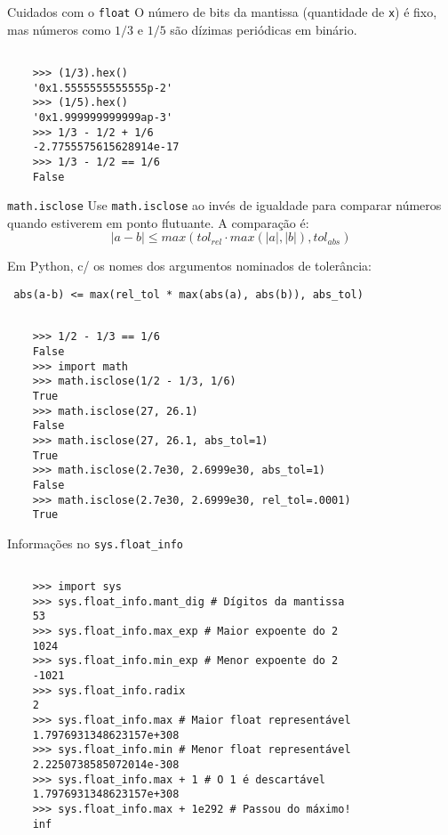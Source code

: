 \documentclass[utf8]{beamer}
\begin{document}
\begin{frame}[fragile]{Cuidados com o \texttt{float}}
  O número de bits da mantissa (quantidade de \texttt{x}) é fixo,
  mas números como $1/3$ e $1/5$ são dízimas periódicas em binário.

  \begin{verbatim}

    >>> (1/3).hex()
    '0x1.5555555555555p-2'
    >>> (1/5).hex()
    '0x1.999999999999ap-3'
    >>> 1/3 - 1/2 + 1/6
    -2.7755575615628914e-17
    >>> 1/3 - 1/2 == 1/6
    False

  \end{verbatim}

\end{frame}


\begin{frame}[fragile]{\texttt{math.isclose}}
  Use \texttt{math.isclose} ao invés de igualdade
  para comparar números quando estiverem em ponto flutuante.
  A comparação é:
  \[ |a-b| \le max(tol_{rel} \cdot max(|a|, |b|), tol_{abs}) \]

  Em Python, c/ os nomes dos argumentos nominados de tolerância:
  \begin{center}
    \texttt{
      abs(a-b) <= max(rel_tol * max(abs(a), abs(b)), abs_tol)
    }
  \end{center}

  \begin{verbatim}

    >>> 1/2 - 1/3 == 1/6
    False
    >>> import math
    >>> math.isclose(1/2 - 1/3, 1/6)
    True
    >>> math.isclose(27, 26.1)
    False
    >>> math.isclose(27, 26.1, abs_tol=1)
    True
    >>> math.isclose(2.7e30, 2.6999e30, abs_tol=1)
    False
    >>> math.isclose(2.7e30, 2.6999e30, rel_tol=.0001)
    True

  \end{verbatim}
\end{frame}


\begin{frame}[fragile]{Informações no \texttt{sys.float\_info}}

  \begin{verbatim}

    >>> import sys
    >>> sys.float_info.mant_dig # Dígitos da mantissa
    53
    >>> sys.float_info.max_exp # Maior expoente do 2
    1024
    >>> sys.float_info.min_exp # Menor expoente do 2
    -1021
    >>> sys.float_info.radix
    2
    >>> sys.float_info.max # Maior float representável
    1.7976931348623157e+308
    >>> sys.float_info.min # Menor float representável
    2.2250738585072014e-308
    >>> sys.float_info.max + 1 # O 1 é descartável
    1.7976931348623157e+308
    >>> sys.float_info.max + 1e292 # Passou do máximo!
    inf

  \end{verbatim}

\end{frame}
\end{document}
